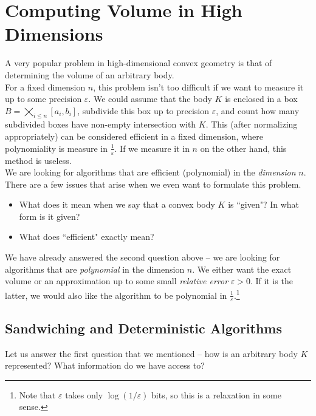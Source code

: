\section{Computing Volume in High Dimensions}

A very popular problem in high-dimensional convex geometry is that of determining the volume of an arbitrary body.\\

For a fixed dimension $n$, this problem isn't too difficult if we want to measure it up to some precision $\varepsilon$. We could assume that the body $K$ is enclosed in a box $B=\bigtimes_{i\leq n}[a_i,b_i]$, subdivide this box up to precision $\varepsilon$, and count how many subdivided boxes have non-empty intersection with $K$. This (after normalizing appropriately) can be considered efficient in a fixed dimension, where polynomiality is measure in $\frac{1}{\varepsilon}$. If we measure it in $n$ on the other hand, this method is useless.\\
We are looking for algorithms that are efficient (polynomial) in the \textit{dimension} $n$.\\

There are a few issues that arise when we even want to formulate this problem.
\begin{itemize}
    \item What does it mean when we say that a convex body $K$ is ``given"? In what form is it given?
    \item What does ``efficient" exactly mean?
\end{itemize}

We have already answered the second question above -- we are looking for algorithms that are \textit{polynomial} in the dimension $n$. We either want the exact volume or an approximation up to some small \textit{relative error} $\varepsilon>0$. If it is the latter, we would also like the algorithm to be polynomial in $\frac{1}{\varepsilon}$.\footnote{Note that $\varepsilon$ takes only $\log(1/\varepsilon)$ bits, so this is a relaxation in some sense.}

\subsection{Sandwiching and Deterministic Algorithms}
\label{subsec: sandwiching and deterministic algorithms}

Let us answer the first question that we mentioned -- how is an arbitrary body $K$ represented? What information do we have access to?

